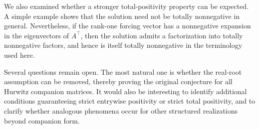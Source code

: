 \documentclass[12pt]{article}
\newcommand{\tp}{^{\top}}
\begin{document}
We also examined whether a stronger total-positivity property can be expected.
A simple example shows that the solution need not be totally nonnegative in
general.  Nevertheless, if the rank-one forcing vector has a nonnegative
expansion in the eigenvectors of $A\tp$, then the solution admits a
factorization into totally nonnegative factors, and hence is itself totally
nonnegative in the terminology used here.

Several questions remain open.  The most natural one is whether the real-root
assumption can be removed, thereby proving the original conjecture for all
Hurwitz companion matrices.  It would also be interesting to identify
additional conditions guaranteeing strict entrywise positivity or strict total
positivity, and to clarify whether analogous phenomena occur for other
structured realizations beyond companion form.








%
%
%
%
%
\end{document}
